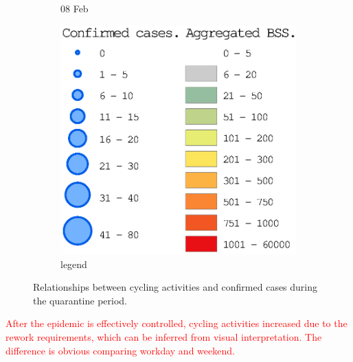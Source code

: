 \documentclass[preprints,ijgi,submit,moreauthors]{Definitions/mdpi}
\begin{document}
\begin{figure}[H]
\begin{subfigure}{.3\textwidth}
        \caption{08 Feb}
    \end{subfigure}
    \begin{subfigure}{.3\textwidth}
        \includegraphics[width=\textwidth]{Figures/Figure7/Fig7legend.eps}
        \caption{legend}
    \end{subfigure}
    \caption{Relationships between cycling activities and confirmed cases during the quarantine period.}
    \label{fig:BSS_phase1_2}
\end{figure}
\textcolor{red}{After the epidemic is effectively controlled, cycling activities increased due to the rework requirements, which can be inferred from visual interpretation. The difference is obvious comparing workday and weekend.}
\end{document}
